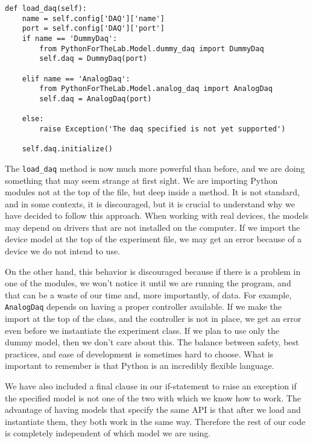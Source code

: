 \begin{verbatim}
def load_daq(self):
    name = self.config['DAQ']['name']
    port = self.config['DAQ']['port']
    if name == 'DummyDaq':
        from PythonForTheLab.Model.dummy_daq import DummyDaq
        self.daq = DummyDaq(port)

    elif name == 'AnalogDaq':
        from PythonForTheLab.Model.analog_daq import AnalogDaq
        self.daq = AnalogDaq(port)

    else:
        raise Exception('The daq specified is not yet supported')

    self.daq.initialize()
\end{verbatim}

The \texttt{load\_daq} method is now much more powerful than before, and we are doing something that may seem strange at first sight. We are importing Python modules not at the top of the file, but deep inside a method. It is not standard, and in some contexts, it is discouraged, but it is crucial to understand why we have decided to follow this approach. When working with real devices, the models may depend on drivers that are not installed on the computer. If we import the device model at the top of the experiment file, we may get an error because of a device we do not intend to use.

On the other hand, this behavior is discouraged because if there is a problem in one of the modules, we won't notice it until we are running the program, and that can be a waste of our time and, more importantly, of data. For example, \texttt{AnalogDaq} depends on having a proper controller available. If we make the import at the top of the class, and the controller is not in place, we get an error even before we instantiate the experiment class. If we plan to use only the dummy model, then we don't care about this. The balance between safety, best practices, and ease of development is sometimes hard to choose. What is important to remember is that Python is an incredibly flexible language.

We have also included a final clause in our if-statement to raise an exception if the specified model is not one of the two with which we know how to work. The advantage of having models that specify the same API is that after we load and instantiate them, they both work in the same way. Therefore the rest of our code is completely independent of which model we are using.


